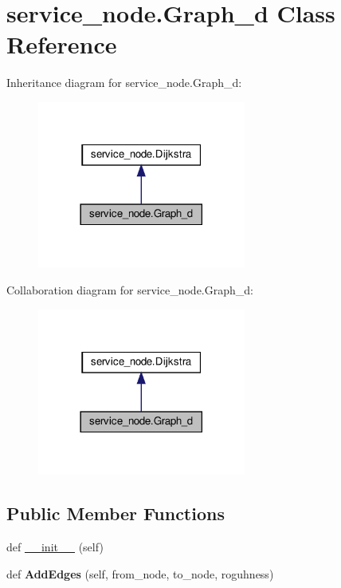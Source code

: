 \hypertarget{classservice__node_1_1Graph__d}{}\section{service\+\_\+node.\+Graph\+\_\+d Class Reference}
\label{classservice__node_1_1Graph__d}


Inheritance diagram for service\+\_\+node.\+Graph\+\_\+d\+:\nopagebreak
\begin{figure}[H]
\begin{center}
\leavevmode
\includegraphics[width=194pt]{classservice__node_1_1Graph__d__inherit__graph}
\end{center}
\end{figure}


Collaboration diagram for service\+\_\+node.\+Graph\+\_\+d\+:\nopagebreak
\begin{figure}[H]
\begin{center}
\leavevmode
\includegraphics[width=194pt]{classservice__node_1_1Graph__d__coll__graph}
\end{center}
\end{figure}
\subsection*{Public Member Functions}
\begin{DoxyCompactItemize}
\item 
def \hyperlink{classservice__node_1_1Graph__d_a76ed82f1e5e08fb2fbd979a1c7a988ee}{\+\_\+\+\_\+init\+\_\+\+\_\+} (self)
\item 
\mbox{\label{classservice__node_1_1Graph__d_adaf7f491fe653300d1ccfac05ee36eff}} 
def {\bfseries Add\+Edges} (self, from\+\_\+node, to\+\_\+node, roguhness)
\end{DoxyCompactItemize}
